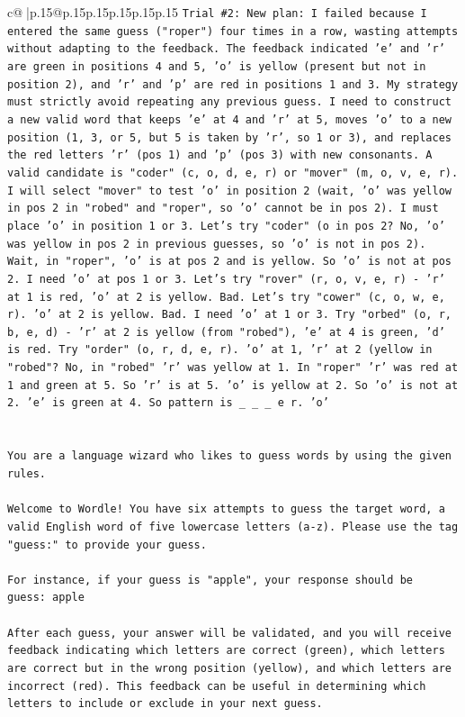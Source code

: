 \documentclass{article}
\begin{document}
{\begin{supertabular}{c@{$\;$}|p{.15\linewidth}@{}p{.15\linewidth}p{.15\linewidth}p{.15\linewidth}p{.15\linewidth}p{.15\linewidth}}
{{{\texttt{Trial \#2: New plan: I failed because I entered the same guess ("roper") four times in a row, wasting attempts without adapting to the feedback. The feedback indicated 'e' and 'r' are green in positions 4 and 5, 'o' is yellow (present but not in position 2), and 'r' and 'p' are red in positions 1 and 3. My strategy must strictly avoid repeating any previous guess. I need to construct a new valid word that keeps 'e' at 4 and 'r' at 5, moves 'o' to a new position (1, 3, or 5, but 5 is taken by 'r', so 1 or 3), and replaces the red letters 'r' (pos 1) and 'p' (pos 3) with new consonants. A valid candidate is "coder" (c, o, d, e, r) or "mover" (m, o, v, e, r). I will select "mover" to test 'o' in position 2 (wait, 'o' was yellow in pos 2 in "robed" and "roper", so 'o' cannot be in pos 2). I must place 'o' in position 1 or 3. Let's try "coder" (o in pos 2? No, 'o' was yellow in pos 2 in previous guesses, so 'o' is not in pos 2). Wait, in "roper", 'o' is at pos 2 and is yellow. So 'o' is not at pos 2. I need 'o' at pos 1 or 3. Let's try "rover" (r, o, v, e, r) {-} 'r' at 1 is red, 'o' at 2 is yellow. Bad. Let's try "cower" (c, o, w, e, r). 'o' at 2 is yellow. Bad. I need 'o' at 1 or 3. Try "orbed" (o, r, b, e, d) {-} 'r' at 2 is yellow (from "robed"), 'e' at 4 is green, 'd' is red. Try "order" (o, r, d, e, r). 'o' at 1, 'r' at 2 (yellow in "robed"? No, in "robed" 'r' was yellow at 1. In "roper" 'r' was red at 1 and green at 5. So 'r' is at 5. 'o' is yellow at 2. So 'o' is not at 2. 'e' is green at 4. So pattern is \_ \_ \_ e r. 'o'} \\
\\ 
\\ 
\texttt{You are a language wizard who likes to guess words by using the given rules.} \\
\\ 
\texttt{Welcome to Wordle! You have six attempts to guess the target word, a valid English word of five lowercase letters (a{-}z). Please use the tag "guess:" to provide your guess.} \\
\\ 
\texttt{For instance, if your guess is "apple", your response should be} \\
\texttt{guess: apple} \\
\\ 
\texttt{After each guess, your answer will be validated, and you will receive feedback indicating which letters are correct (green), which letters are correct but in the wrong position (yellow), and which letters are incorrect (red). This feedback can be useful in determining which letters to include or exclude in your next guess.} \\
}}}
\end{supertabular}}
\end{document}
